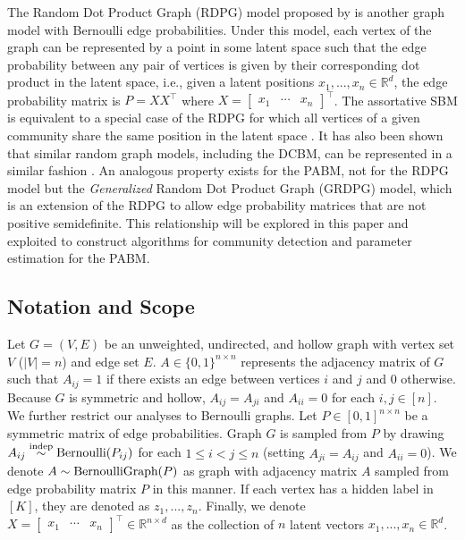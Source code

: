 \documentclass[12pt]{article}
\begin{document}
The Random Dot Product Graph (RDPG) model proposed by
\citet*{10.1007/978-3-540-77004-6_11} is another graph model with
Bernoulli edge probabilities. Under this model, each vertex of the graph
can be represented by a point in some latent space such that the edge
probability between any pair of vertices is given by their corresponding
dot product in the latent space, i.e., given a latent positions
\(x_1, ..., x_n \in \mathbb{R}^d\), the edge probability matrix is
\(P = X X^\top\) where
\(X = \begin{bmatrix} x_1 & \cdots & x_n \end{bmatrix}^\top\). The assortative
SBM is equivalent to a special case of the RDPG for which all vertices
of a given community share the same position in the latent space
\cite{lyzinski2014}. It has also been shown that similar random graph
models, including the DCBM, can be represented in a similar fashion
\cite{lyzinski2014, rubindelanchy2017consistency}. An analogous
property exists for the PABM, not for the RDPG model but the
\emph{Generalized} Random Dot Product Graph (GRDPG) model, which is an
extension of the RDPG to allow edge probability matrices that are not positive
semidefinite. This relationship will be explored in this paper and exploited to
construct algorithms for community detection and parameter estimation for the
PABM.

\hypertarget{notation}{%
\subsection{Notation and Scope}\label{notation}}

Let $G = (V, E)$ be an unweighted, undirected, and hollow graph with vertex set $V$ ($|V| = n$) and edge set $E$. $A \in \{0, 1\}^{n \times n}$ represents the adjacency matrix of $G$ such that $A_{ij} = 1$ if there exists an edge between vertices $i$ and $j$ and $0$ otherwise. Because $G$ is symmetric and hollow,
$A_{ij} = A_{ji}$ and $A_{ii} = 0$ for each $i, j \in [n]$. We further restrict our analyses to Bernoulli graphs. Let $P \in [0, 1]^{n \times n}$ be a symmetric matrix of edge probabilities. Graph $G$ is sampled from $P$ by drawing $A_{ij} \stackrel{\text{indep}}{\sim} \text{Bernoulli}(P_{ij})$ for each $1 \leq i < j \leq n$  (setting $A_{ji} = A_{ij}$ and $A_{ii} = 0$). We denote $A \sim \text{BernoulliGraph}(P)$ as graph with adjacency matrix $A$ sampled from edge probability matrix $P$ in this manner. If each vertex has a hidden label in $[K]$, they are denoted as $z_1, ..., z_n$. Finally, we denote $X = \begin{bmatrix} x_1 & \cdots & x_n \end{bmatrix}^\top \in \mathbb{R}^{n \times d}$ as the collection of $n$ latent vectors $x_1, ..., x_n \in \mathbb{R}^d$.
\end{document}
